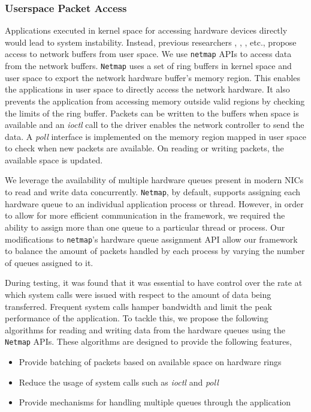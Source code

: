 \documentclass[10pt, conference, compsocconf, reqno]{IEEEtran}
\begin{document}
\subsubsection{Userspace Packet Access}
Applications executed in kernel space for accessing hardware devices directly would lead to system instability. Instead, previous researchers \cite{Rizzo:2012:RNI:2090147.2103536}, \cite{1564468}, \cite{Krasnyansky}, etc., propose access to network buffers from user space. We use \texttt{netmap} APIs \cite{Rizzo:2012:RNI:2090147.2103536} to access data from the network buffers. \texttt{Netmap} uses a set of ring buffers in kernel space and user space to export the network hardware buffer's memory region. This enables the applications in user space to directly access the network hardware. It also prevents the application from accessing memory outside valid regions by checking the limits of the ring buffer. Packets can be written to the buffers when space is available and an \textit{ioctl} call to the driver enables the network controller to send the data. A \textit{poll} interface is implemented on the memory region mapped in user space to check when new packets are available. On reading or writing packets, the available space is updated.

We leverage the availability of multiple hardware queues present in modern NICs to read and write data concurrently. \texttt{Netmap}, by default, supports assigning each hardware queue to an individual application process or thread. However, in order to allow for more efficient communication in the framework, we required the ability to assign more than one queue to a particular thread or process. Our modifications to \texttt{netmap}'s hardware queue assignment API allow our framework to balance the amount of packets handled by each process by varying the number of queues assigned to it.

During testing, it was found that it was essential to have control over the rate at which system calls were issued with respect to the amount of data being transferred. Frequent system calls hamper bandwidth and limit the peak performance of the application. To tackle this, we propose the following algorithms for reading and writing data from the hardware queues using the \texttt{Netmap} APIs. These algorithms are designed to provide the following features,

\begin{itemize}

\item Provide batching of packets based on available space on hardware rings
\item Reduce the usage of system calls such as \textit{ioctl} and \textit {poll}
\item Provide mechanisms for handling multiple queues through the application

\end{itemize}
\end{document}
